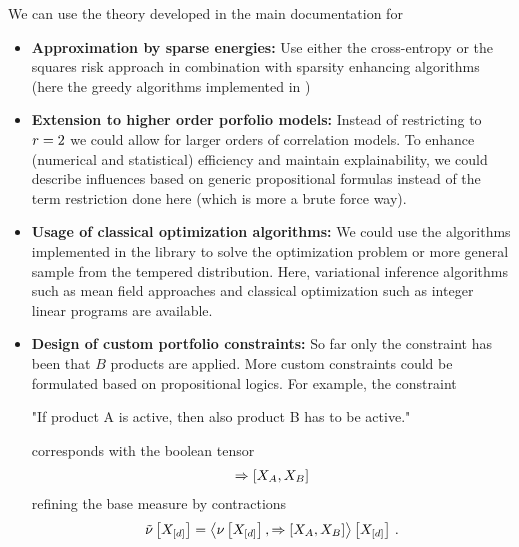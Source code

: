 \documentclass[aps,onecolumn,nofootinbib,pra]{article}
\begin{document}
    We can use the theory developed in the main documentation for
    \begin{itemize}
        \item \textbf{Approximation by sparse energies:} Use either the cross-entropy or the squares risk approach in combination with sparsity enhancing algorithms (here the greedy algorithms implemented in \tnreason{})
        \item \textbf{Extension to higher order porfolio models:} Instead of restricting to $r=2$ we could allow for larger orders of correlation models.
        To enhance (numerical and statistical) efficiency and maintain explainability, we could describe influences based on generic propositional formulas instead of the term restriction done here (which is more a brute force way).
        \item \textbf{Usage of classical optimization algorithms:} We could use the algorithms implemented in the \tnreason{} library to solve the optimization problem or more general sample from the tempered distribution.
        Here, variational inference algorithms such as mean field approaches and classical optimization such as integer linear programs are available.
        \item \textbf{Design of custom portfolio constraints:} So far only the constraint has been that $B$ products are applied.
        More custom constraints could be formulated based on propositional logics.
        For example, the constraint
        \begin{center}
            "If product A is active, then also product B has to be active."
        \end{center}
        corresponds with the boolean tensor
        \begin{align*}
            \Rightarrow \left[X_{A},X_{B}\right]
        \end{align*}
        refining the base measure by contractions
        \begin{align*}
            \tilde{\nu}\left[X_{[d]}\right] = \left\langle \nu\left[X_{[d]}\right],\Rightarrow\left[X_{A},X_{B}\right]\right\rangle \left[ X_{[d]} \right] \, .
        \end{align*}
    \end{itemize}
\end{document}
